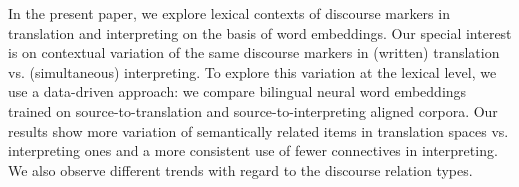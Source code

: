 In the present paper, we explore lexical contexts of discourse markers in translation and interpreting on the basis of word embeddings. Our special interest is on contextual variation of the same discourse markers in (written) translation  vs. (simultaneous) interpreting. To explore this variation at the lexical level, we use a data-driven approach: we compare bilingual neural word embeddings trained on source-to-translation and source-to-interpreting aligned corpora. Our results show more variation of semantically related items in translation spaces vs. interpreting ones and a more consistent use of fewer connectives in interpreting. We also observe different trends with regard to the discourse relation types.
